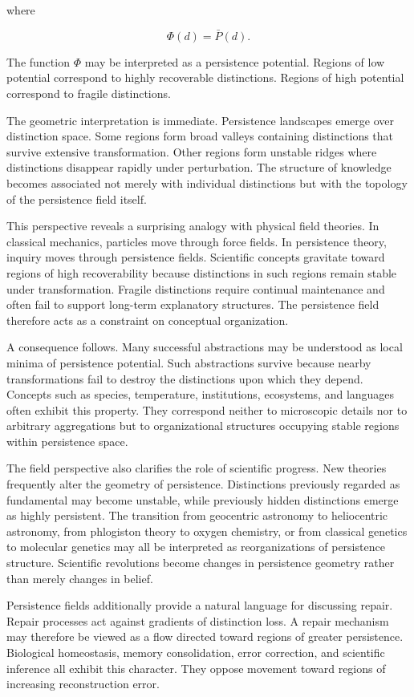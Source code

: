 \documentclass[12pt,oneside]{article}
\theoremstyle{definition}
\begin{document}
where

\[
\Phi(d)
=
\bar P(d).
\]

The function \(\Phi\) may be interpreted as a persistence potential. Regions of low potential correspond to highly recoverable distinctions. Regions of high potential correspond to fragile distinctions.

The geometric interpretation is immediate. Persistence landscapes emerge over distinction space. Some regions form broad valleys containing distinctions that survive extensive transformation. Other regions form unstable ridges where distinctions disappear rapidly under perturbation. The structure of knowledge becomes associated not merely with individual distinctions but with the topology of the persistence field itself.

This perspective reveals a surprising analogy with physical field theories. In classical mechanics, particles move through force fields. In persistence theory, inquiry moves through persistence fields. Scientific concepts gravitate toward regions of high recoverability because distinctions in such regions remain stable under transformation. Fragile distinctions require continual maintenance and often fail to support long-term explanatory structures. The persistence field therefore acts as a constraint on conceptual organization.

A consequence follows. Many successful abstractions may be understood as local minima of persistence potential. Such abstractions survive because nearby transformations fail to destroy the distinctions upon which they depend. Concepts such as species, temperature, institutions, ecosystems, and languages often exhibit this property. They correspond neither to microscopic details nor to arbitrary aggregations but to organizational structures occupying stable regions within persistence space.

The field perspective also clarifies the role of scientific progress. New theories frequently alter the geometry of persistence. Distinctions previously regarded as fundamental may become unstable, while previously hidden distinctions emerge as highly persistent. The transition from geocentric astronomy to heliocentric astronomy, from phlogiston theory to oxygen chemistry, or from classical genetics to molecular genetics may all be interpreted as reorganizations of persistence structure. Scientific revolutions become changes in persistence geometry rather than merely changes in belief.

Persistence fields additionally provide a natural language for discussing repair. Repair processes act against gradients of distinction loss. A repair mechanism may therefore be viewed as a flow directed toward regions of greater persistence. Biological homeostasis, memory consolidation, error correction, and scientific inference all exhibit this character. They oppose movement toward regions of increasing reconstruction error.
\end{document}
